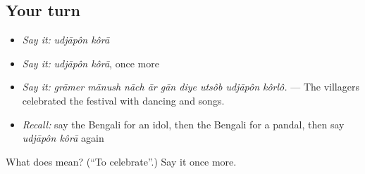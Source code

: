\subsection*{Your turn}
\begin{itemize}
\raggedright
  \item \emph{Say it:} \emph{udjāpôn kôrā}
  \item \emph{Say it:} \emph{udjāpôn kôrā}, once more
  \item \emph{Say it:} \emph{grāmer mānush nāch ār gān diye utsôb udjāpôn kôrlô.} — The villagers celebrated the festival with dancing and songs.
  \item \emph{Recall:} say the Bengali for an idol, then the Bengali for a pandal, then say \emph{udjāpôn kôrā} again
\end{itemize}

\begin{tcolorbox}[breakable,colback=teal!4,colframe=teal!35!black,title={Before you move on}]
What does   mean? (\textquotedblleft{}To celebrate\textquotedblright{}.) Say it once more.
\end{tcolorbox}
